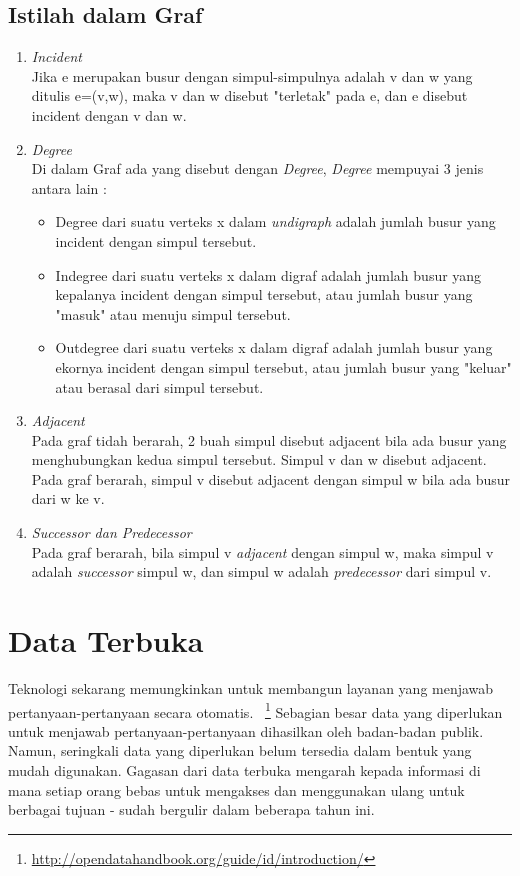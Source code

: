 \subsection{Istilah dalam Graf}
\label{sec: Istilah dalam Graf}
\begin{enumerate}
\item \textit{Incident}\\
Jika e merupakan busur dengan simpul-simpulnya adalah v dan w yang
ditulis e=(v,w), maka v dan w disebut "terletak" pada e, dan e disebut incident
dengan v dan w.
\item \textit{Degree}\\
Di dalam Graf ada yang disebut dengan \textit{Degree}, \textit{Degree} mempuyai 3 jenis antara lain :
\begin{itemize}
\item Degree dari suatu verteks x dalam \textit{undigraph} adalah jumlah busur yang
incident dengan simpul tersebut.
\item Indegree dari suatu verteks x dalam digraf adalah jumlah busur yang
kepalanya incident dengan simpul tersebut, atau jumlah busur yang "masuk" atau menuju simpul tersebut.
\item Outdegree dari suatu verteks x dalam digraf adalah jumlah busur yang
ekornya incident dengan simpul tersebut, atau jumlah busur yang "keluar"
atau berasal dari simpul tersebut.
\end{itemize}
\item \textit{Adjacent}\\
Pada graf tidah berarah, 2 buah simpul disebut adjacent bila ada busur yang
menghubungkan kedua simpul tersebut. Simpul v dan w disebut adjacent. 
Pada graf berarah, simpul v disebut adjacent dengan simpul w bila ada busur
dari w ke v.
\item \textit{Successor dan Predecessor}\\
Pada graf berarah, bila simpul v \textit{adjacent} dengan simpul w, maka simpul v adalah \textit{successor} simpul w, dan simpul w adalah \textit{predecessor} dari simpul v.
\end{enumerate}

\section{Data Terbuka}
\label{sec: Data Terbuka}

Teknologi sekarang memungkinkan untuk membangun layanan yang menjawab pertanyaan-pertanyaan secara otomatis.~\cite{open:04:terbuka} \footnote{\url{http://opendatahandbook.org/guide/id/introduction/}} Sebagian besar data yang diperlukan untuk menjawab pertanyaan-pertanyaan dihasilkan oleh badan-badan publik. Namun, seringkali data yang diperlukan belum tersedia dalam bentuk yang mudah digunakan. Gagasan dari data terbuka mengarah kepada informasi di mana setiap orang bebas untuk mengakses dan menggunakan ulang untuk berbagai tujuan - sudah bergulir dalam beberapa tahun ini.  	

